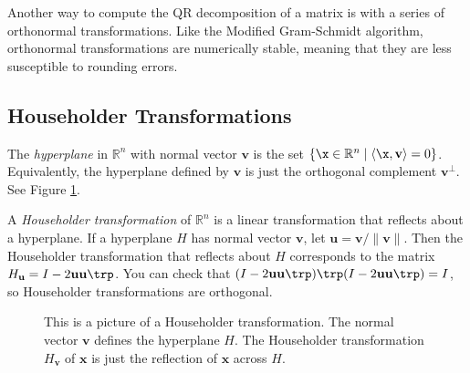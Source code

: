 Another way to compute the QR decomposition of a matrix is with a series of orthonormal transformations.
Like the Modified Gram-Schmidt algorithm, orthonormal transformations are numerically stable, meaning that they are less susceptible to rounding errors.

\subsection*{Householder Transformations} %

The \emph{hyperplane} in $\mathbb{R}^n$ with normal vector $\mathbf{v}$ is the set $\{ \x \in \mathbb{R}^n \mid \langle \x, \mathbf{v} \rangle = 0 \}$.
Equivalently, the hyperplane defined by $\mathbf{v}$ is just the orthogonal complement $\mathbf{v}^{\perp}$.
See Figure \ref{fig:Householder_reflector}.

A \emph{Householder transformation} of $\mathbb{R}^n$ is a linear transformation that reflects about a hyperplane.
If a hyperplane $H$ has normal vector $\mathbf{v}$, let $\mathbf{u} = \mathbf{v}/\|\mathbf{v}\|$.
Then the Householder transformation that reflects about $H$ corresponds to the matrix $H_{\mathbf{u}} = I - 2 \mathbf{u}\mathbf{u}\trp$.
You can check that $(I - 2 \mathbf{u}\mathbf{u}\trp)\trp(I - 2 \mathbf{u}\mathbf{u}\trp)=I$, so Householder transformations are orthogonal.

\begin{figure}
\begin{center}
\end{center}
\caption{This is a picture of a Householder transformation.
The normal vector $\mathbf{v}$ defines the hyperplane $H$.
The Householder transformation $H_{\mathbf{v}}$ of $\mathbf{x}$ is just the reflection of $\mathbf{x}$ across $H$.}
\label{fig:Householder_reflector}
\end{figure}

